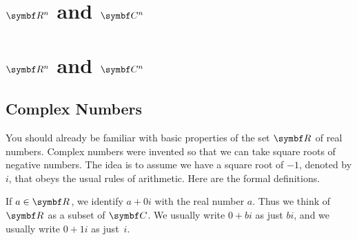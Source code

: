\ifnum{}
    \section{\texorpdfstring{$\R n$ and $\C n$}{Rn and Cn}} %
    \else
    \section{$\R n$ and $\C n$}
    \fi


\subsection{Complex Numbers}

You should already be familiar with basic properties of the set
$\R{}$ of real numbers.  Complex numbers were invented so that we
can take square roots of negative numbers.  The
idea is to assume we have  a square root of $-1$,
denoted by $i$, that obeys the usual rules of arithmetic. Here are the formal definitions.


If $a \in \R{}$, we identify $a + 0i$ with the real number $a$.    Thus we
think of $\R{}$ as a subset of $\C{}$. We usually write $0 + bi$ as just $bi$, and we usually write $0 + 1i$ as just~$i$.

